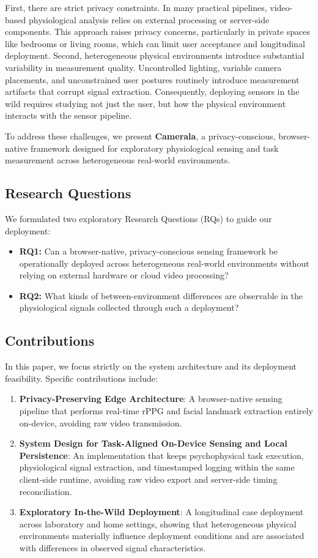 \documentclass[dvipdfmx]{ehis}
\begin{document}
First, there are strict privacy constraints. In many practical pipelines, video-based physiological analysis relies on external processing or server-side components. This approach raises privacy concerns, particularly in private spaces like bedrooms or living rooms, which can limit user acceptance and longitudinal deployment.
Second, heterogeneous physical environments introduce substantial variability in measurement quality. Uncontrolled lighting, variable camera placements, and unconstrained user postures routinely introduce measurement artifacts that corrupt signal extraction. Consequently, deploying sensors in the wild requires studying not just the user, but how the physical environment interacts with the sensor pipeline.

To address these challenges, we present \textbf{Camerala}, a privacy-conscious, browser-native framework designed for exploratory physiological sensing and task measurement across heterogeneous real-world environments.

\subsection{Research Questions}
We formulated two exploratory Research Questions (RQs) to guide our deployment:
\begin{itemize}
    \item \textbf{RQ1:} Can a browser-native, privacy-conscious sensing framework be operationally deployed across heterogeneous real-world environments without relying on external hardware or cloud video processing?
    \item \textbf{RQ2:} What kinds of between-environment differences are observable in the physiological signals collected through such a deployment?
\end{itemize}

\subsection{Contributions}
In this paper, we focus strictly on the system architecture and its deployment feasibility. Specific contributions include:

\begin{enumerate}
    \item \textbf{Privacy-Preserving Edge Architecture}: A browser-native sensing pipeline that performs real-time rPPG and facial landmark extraction entirely on-device, avoiding raw video transmission.
    \item \textbf{System Design for Task-Aligned On-Device Sensing and Local Persistence}: An implementation that keeps psychophysical task execution, physiological signal extraction, and timestamped logging within the same client-side runtime, avoiding raw video export and server-side timing reconciliation.
    \item \textbf{Exploratory In-the-Wild Deployment}: A longitudinal case deployment across laboratory and home settings, showing that heterogeneous physical environments materially influence deployment conditions and are associated with differences in observed signal characteristics.
\end{enumerate}
\end{document}

